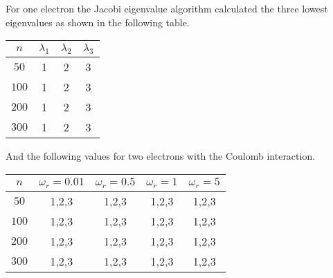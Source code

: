 For one electron the Jacobi eigenvalue algorithm calculated the
three lowest eigenvalues as shown in the following table.
\begin{center}
    \begin{tabular}{|c|c|c|c|}
        \hline
        $n$ & $\lambda_1$ & $\lambda_2$ & $\lambda_3$ \\
        \hline
        \hline
        $50$ & 1 & 2 & 3 \\
        \hline
        $100$ & 1 & 2 & 3 \\
        \hline
        $200$ & 1 & 2 & 3 \\
        \hline
        $300$ & 1 & 2 & 3 \\
        \hline
    \end{tabular}
\end{center}
And the following values for two electrons with the Coulomb
interaction.
\begin{center}
    \begin{tabular}{|c|c|c|c|c|}
        \hline
        $n$ & $\omega_r = 0.01$ & $\omega_r = 0.5$ & $\omega_r = 1$
        & $\omega_r = 5$ \\
        \hline
        \hline
        $50$ & 1,2,3 & 1,2,3 & 1,2,3 & 1,2,3 \\
        \hline
        $100$ & 1,2,3 & 1,2,3 & 1,2,3 & 1,2,3 \\
        \hline
        $200$ & 1,2,3 & 1,2,3 & 1,2,3 & 1,2,3 \\
        \hline
        $300$ & 1,2,3 & 1,2,3 & 1,2,3 & 1,2,3 \\
        \hline
    \end{tabular}
\end{center}
